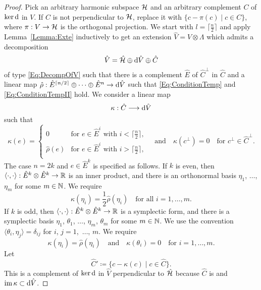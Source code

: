 \documentclass[\MainFolder/Text.tex]{subfiles}
\begin{document}
\begin{proof}
Pick an arbitrary harmonic subspace $\mathcal{H}$ and an arbitrary complement $C$ of $\ker \mathrm{d}$ in $V$.
If $C$ is not perpendicular to $\mathcal{H}$, replace it with $\{c - \pi(c)\mid c\in C\}$, where $\pi: V \rightarrow \mathcal{H}$ is the orthogonal projection.
We start with $l=\lceil \frac{n}{2} \rceil$ and apply Lemma~\ref{Lemma:Exte} inductively to get an extension $\hat{V} = V \otimes \Lambda$ which admits a decomposition 
\begin{equation}\label{Eq:HatDecomp}
\hat{V} = \hat{\mathcal{H}}\oplus\mathrm{d}\hat{V}\oplus\hat{C}
\end{equation}
of type \eqref{Eq:DecompOfV} such that there is a complement $\hat{E}$ of $\hat{C}^\perp$ in $\hat{C}$ and a linear map $\hat{\rho}: \hat{E}^{\lceil n/2\rceil}\oplus\dotsb\oplus\hat{E}^n\rightarrow\mathrm{d}\hat{V}$ such that \eqref{Eq:ConditionTemp} and \eqref{Eq:ConditionTempII} hold.
We consider a linear map
\[
\kappa: \hat{C} \longrightarrow \mathrm{d} \hat{V}
\]
such that
\[
\kappa(e)=
\begin{cases}
	0 & \text{for }e\in \hat{E}^i\text{ with }i<\lceil\frac{n}{2}\rceil,\\
	\hat{\rho}(e) & \text{for }e\in \hat{E}^i\text{ with } i>\lceil\frac{n}{2}\rceil, \\
\end{cases}\quad\text{and}\quad \kappa(c^\perp) = 0\quad\text{for }c^\perp\in\hat{C}^\perp.
\]
The case $n = 2k$ and $e\in \hat{E}^k$ is specified as follows.
If $k$ is even, then $\langle \cdot,\cdot \rangle: \hat{E}^{k}\otimes \hat{E}^{k} \rightarrow \mathbb{R}$ is an inner product, and there is an orthonormal basis $\eta_1$, $\dotsc$, $\eta_m$ for some $m\in\mathbb{N}$.
We require
\begin{equation}\label{Eq:InnerProdCase}
 \kappa(\eta_i) = \frac{1}{2}\hat{\rho}(\eta_i)\quad\text{for all }i=1, \dotsc, m.
\end{equation}
If $k$ is odd, then $\langle \cdot,\cdot \rangle: \hat{E}^{k}\otimes \hat{E}^{k} \rightarrow \mathbb{R}$ is a symplectic form, and there is a symplectic basis $\eta_1$, $\theta_1$, $\dotsc$, $\eta_m$, $\theta_m$ for some $m\in\mathbb{N}$.
We use the convention $\langle \theta_i,\eta_j\rangle = \delta_{ij}$ for $i$, $j=1$,~$\dotsc$, $m$.
We require 
\begin{equation}\label{Eq:SymplCase}
 \kappa(\eta_i) = \hat{\rho}(\eta_i)\quad\text{and}\quad\kappa(\theta_i)= 0\quad\text{for }i=1,\dotsc,m.
\end{equation}
Let 
\[
\hat{C}' \coloneqq \{c - \kappa(c) \mid c\in \hat{C}\}.
\]
This is a complement of $\ker \mathrm{d}$ in $\hat{V}$ perpendicular to $\hat{\mathcal{H}}$ because $\hat{C}$ is and $\operatorname{im} \kappa \subset\mathrm{d}\hat{V}$.

\end{proof}
\end{document}

